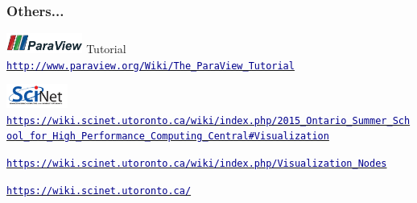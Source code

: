 \begin{frame}
\frametitle{Others...}
	\begin{beamerboxesrounded}[upper=block head,lower=block body,shadow=true]{ %
\href{http://www.paraview.org}{\includegraphics[width=2.5cm]{figs/visit-logos/ParaViewLogo}} Tutorial}
	 \href{http://www.paraview.org/Wiki/The_ParaView_Tutorial}{\textcolor{DarkBlue}{\small \tt http://www.paraview.org/Wiki/The\_ParaView\_Tutorial}}
	\end{beamerboxesrounded}

	\vspace{5mm}
	\begin{beamerboxesrounded}[upper=block head,lower=block body,shadow=true]{ \href{http://www.scinethpc.ca}{\includegraphics[width=2cm,clip=true,trim=0 0mm 0 0]{logos/SciNet_newLogo}}}
		{\small {}} \href{https://wiki.scinet.utoronto.ca/wiki/index.php/2015_Ontario_Summer_School_for_High_Performance_Computing_Central\#Visualization}{\textcolor{DarkBlue}{\tiny\tt https://wiki.scinet.utoronto.ca/wiki/index.php/2015\_Ontario\_Summer\_School\_for\_High\_Performance\_Computing\_Central\#Visualization}}

		{\small {}} \href{https://wiki.scinet.utoronto.ca/wiki/index.php/Visualization_Nodes}{\textcolor{DarkBlue}{\tiny\tt https://wiki.scinet.utoronto.ca/wiki/index.php/Visualization\_Nodes}}

		{\small{}} \href{https://wiki.scinet.utoronto.ca/}{\textcolor{DarkBlue}{\small\tt https://wiki.scinet.utoronto.ca/}}
	\end{beamerboxesrounded}

\end{frame}
